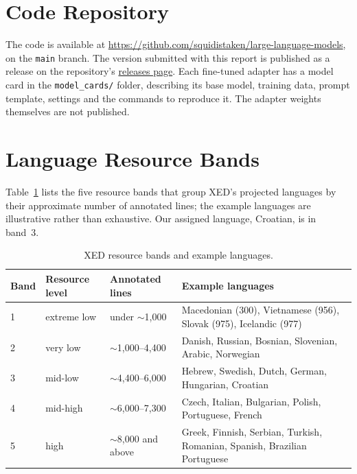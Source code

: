 \section{Code Repository}
\label{app:repository}

The code is available at \href{https://github.com/squidistaken/large-language-models}{https://github.com/squidistaken/large-language-models}, on the \texttt{main} branch. The version submitted with this report is published as a release on the repository's \href{https://github.com/squidistaken/large-language-models/releases}{releases page}. Each fine-tuned adapter has a model card in the \texttt{model\_cards/} folder, describing its base model, training data, prompt template, settings and the commands to reproduce it. The adapter weights themselves are not published.

\section{Language Resource Bands}
\label{app:bands}

Table~\ref{tab:bands} lists the five resource bands that group XED's projected languages by their approximate number of annotated lines; the example languages are illustrative rather than exhaustive. Our assigned language, Croatian, is in band~3.

\begin{table}[H]
    \centering
    \caption{XED resource bands and example languages.}
    \label{tab:bands}
    \begin{tabularx}{\textwidth}{lllX}
        \toprule
        Band & Resource level & Annotated lines & Example languages \\
        \midrule
        1 & extreme low & under $\sim$1,000 & Macedonian (300), Vietnamese (956), Slovak (975), Icelandic (977) \\
        2 & very low & $\sim$1,000--4,400 & Danish, Russian, Bosnian, Slovenian, Arabic, Norwegian \\
        3 & mid-low & $\sim$4,400--6,000 & Hebrew, Swedish, Dutch, German, Hungarian, Croatian \\
        4 & mid-high & $\sim$6,000--7,300 & Czech, Italian, Bulgarian, Polish, Portuguese, French \\
        5 & high & $\sim$8,000 and above & Greek, Finnish, Serbian, Turkish, Romanian, Spanish, Brazilian Portuguese \\
        \bottomrule
    \end{tabularx}
\end{table}

